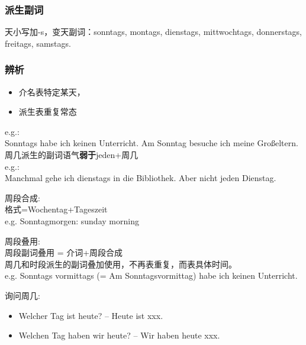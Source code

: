 \subsubsection{派生副词}
天小写加-s，变天副词：sonntags, montags, dienstags, mittwochtags, donnerstags, freitags, samstags.

\subsubsection{辨析}

\begin{itemize}
    \item 介名表特定某天，
    \item 派生表重复常态
\end{itemize}
e.g.: \\
Sonntags habe ich keinen Unterricht. Am Sonntag besuche ich meine Großeltern. \\

周几派生的副词语气\textbf{弱于}jeden+周几 \\
e.g.: \\
Manchmal gehe ich dienstags in die Bibliothek. Aber nicht jeden Dienstag.

周段合成: \\
格式=Wochentag+Tageszeit \\
e.g. Sonntagmorgen: sunday morning

周段叠用: \\
周段副词叠用 = 介词+周段合成 \\
周几和时段派生的副词叠加使用，不再表重复，而表具体时间。 \\
e.g. Sonntags vormittags (= Am Sonntagsvormittag) habe ich keinen Unterricht.

询问周几: \\
\begin{itemize}
    \item Welcher Tag ist heute?  -- Heute ist xxx.
    \item Welchen Tag haben wir heute? -- Wir haben heute xxx.
\end{itemize}

